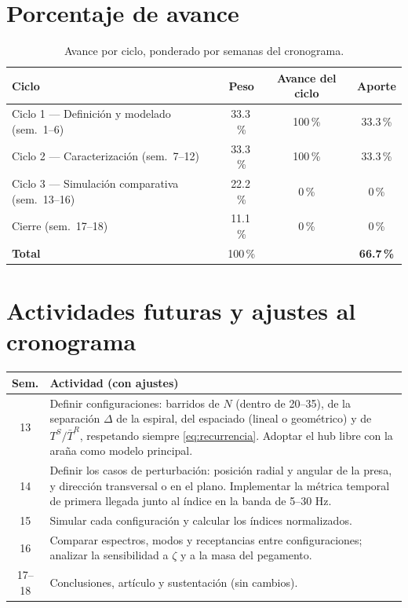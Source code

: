 \documentclass[11pt,letterpaper]{article}
\begin{document}
\section{Porcentaje de avance}\label{sec:porcentaje}

\begin{table}[H]
\centering\small
\caption{Avance por ciclo, ponderado por semanas del cronograma.}
\begin{tabular}{@{}lccc@{}}
\toprule
Ciclo & Peso & Avance del ciclo & Aporte \\
\midrule
Ciclo 1 --- Definición y modelado (sem.\ 1--6) & 33.3\,\% & 100\,\% & 33.3\,\% \\
Ciclo 2 --- Caracterización (sem.\ 7--12) & 33.3\,\% & 100\,\% & 33.3\,\% \\
Ciclo 3 --- Simulación comparativa (sem.\ 13--16) & 22.2\,\% & 0\,\% & 0\,\% \\
Cierre (sem.\ 17--18) & 11.1\,\% & 0\,\% & 0\,\% \\
\midrule
\textbf{Total} & 100\,\% & & \textbf{66.7\,\%} \\
\bottomrule
\end{tabular}
\end{table}

\section{Actividades futuras y ajustes al cronograma}

\begin{table}[H]
\centering\small
\begin{tabular}{@{}cp{14cm}@{}}
\toprule
Sem. & Actividad (con ajustes) \\
\midrule
13 & Definir configuraciones: barridos de $N$ (dentro de 20--35), de la
separación $\Delta$ de la espiral, del espaciado (lineal o geométrico) y de
$T^S/\bar{T}^R$, respetando siempre \eqref{eq:recurrencia}. Adoptar el hub
libre con la araña como modelo principal. \\
14 & Definir los casos de perturbación: posición radial y angular de la
presa, y dirección transversal o en el plano. Implementar la métrica
temporal de primera llegada junto al índice en la banda de 5--30 Hz. \\
15 & Simular cada configuración y calcular los índices normalizados. \\
16 & Comparar espectros, modos y receptancias entre configuraciones;
analizar la sensibilidad a $\zeta$ y a la masa del pegamento. \\
17--18 & Conclusiones, artículo y sustentación (sin cambios). \\
\bottomrule
\end{tabular}
\end{table}
\end{document}
